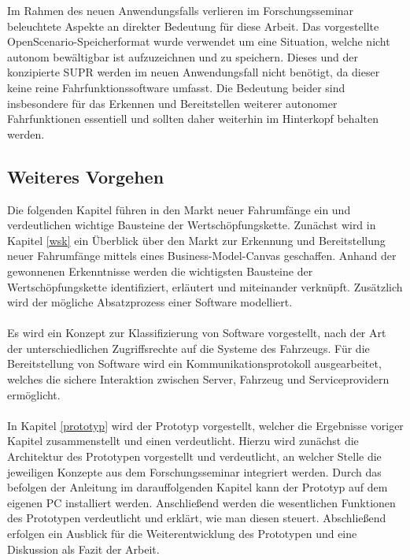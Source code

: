 Im Rahmen des neuen Anwendungsfalls verlieren im Forschungsseminar beleuchtete Aspekte an direkter Bedeutung für diese Arbeit. Das vorgestellte OpenScenario-Speicherformat wurde verwendet um eine Situation, welche nicht autonom bewältigbar ist aufzuzeichnen und zu speichern. Dieses und der konzipierte SUPR werden im neuen Anwendungsfall nicht benötigt, da dieser keine reine Fahrfunktionssoftware umfasst. Die Bedeutung beider sind insbesondere für das Erkennen und Bereitstellen weiterer autonomer Fahrfunktionen essentiell und sollten daher weiterhin im Hinterkopf behalten werden.\\

\subsection{Weiteres Vorgehen}
Die folgenden Kapitel führen in den Markt neuer Fahrumfänge ein und verdeutlichen wichtige  Bausteine der Wertschöpfungskette. Zunächst wird in Kapitel \ref{wsk} ein Überblick über den Markt zur Erkennung und Bereitstellung neuer Fahrumfänge mittels eines Business-Model-Canvas geschaffen. Anhand der gewonnenen Erkenntnisse werden die wichtigsten Bausteine der Wertschöpfungskette identifiziert, erläutert und miteinander verknüpft. Zusätzlich wird der mögliche Absatzprozess einer Software modelliert.\\\\
Es wird ein Konzept zur Klassifizierung von Software vorgestellt, nach der Art der unterschiedlichen Zugriffsrechte auf die Systeme des Fahrzeugs. Für die Bereitstellung von Software wird ein Kommunikationsprotokoll ausgearbeitet, welches die sichere Interaktion zwischen Server, Fahrzeug und Serviceprovidern ermöglicht.\\\\
In Kapitel \ref{prototyp} wird der Prototyp vorgestellt, welcher die Ergebnisse voriger Kapitel zusammenstellt und einen verdeutlicht. Hierzu wird zunächst die Architektur des Prototypen vorgestellt und verdeutlicht, an welcher Stelle die jeweiligen Konzepte aus dem Forschungsseminar integriert werden. Durch das befolgen der Anleitung im darauffolgenden Kapitel kann der Prototyp auf dem eigenen PC installiert werden. Anschließend werden die wesentlichen Funktionen des Prototypen verdeutlicht und erklärt, wie man diesen steuert. Abschließend erfolgen ein Ausblick für die Weiterentwicklung des Prototypen und eine Diskussion als Fazit der Arbeit.